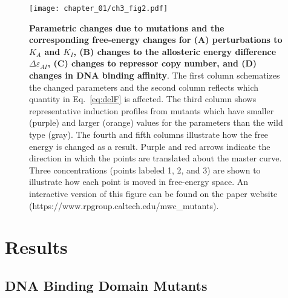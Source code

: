 \documentclass[12pt]{caltech_thesis}
\begin{document}
\hypertarget{fig:deltaF_theory}{%
\begin{figure}
\centering
\texttt{[image: chapter\_01/ch3\_fig2.pdf]}
\caption[{Parametric changes due to mutations and their corresponding
free-energy shifts.}]{\textbf{Parametric changes due to mutations and
the corresponding free-energy changes for (A) perturbations to \(K_A\)
and \(K_I\), (B) changes to the allosteric energy difference
\(\Delta\varepsilon_{AI}\), (C) changes to repressor copy number, and
(D) changes in DNA binding affinity}. The first column schematizes the
changed parameters and the second column reflects which quantity in
Eq.~\ref{eq:delF} is affected. The third column shows representative
induction profiles from mutants which have smaller (purple) and larger
(orange) values for the parameters than the wild type (gray). The fourth
and fifth columns illustrate how the free energy is changed as a result.
Purple and red arrows indicate the direction in which the points are
translated about the master curve. Three concentrations (points labeled
1, 2, and 3) are shown to illustrate how each point is moved in
free-energy space. An interactive version of this figure can be found on
the paper website (https://www.rpgroup.caltech.edu/mwc\_mutants).}
\label{fig:deltaF_theory}
\end{figure}
}

\hypertarget{results-1}{%
\section{Results}\label{results-1}}

\hypertarget{dna-binding-domain-mutants}{%
\subsection{DNA Binding Domain
Mutants}\label{dna-binding-domain-mutants}}
\end{document}
